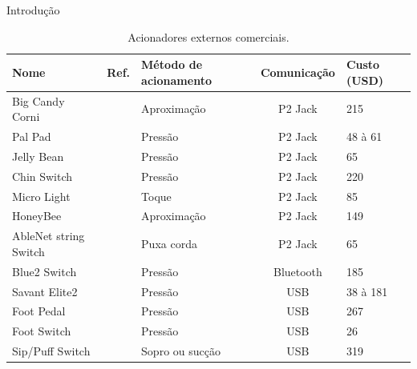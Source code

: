 \begin{chapter}{Introdução}
\begin{table}[!h]
\centering
\caption{Acionadores externos comerciais.}
\label{tab:acionadores}
\def\arraystretch{1.25}
\begin{tabular}{lcp{3cm}cp{3cm}}
	\hline
	\hline
	\textbf{Nome} & \textbf{Ref.} & \textbf{Método de acionamento} & \textbf{Comunicação} & \textbf{Custo (USD)} \\
	\hline
	Big Candy Corni        &~\cite{CandyCorn}        & Aproximação     & P2 Jack      & 215              \\
	Pal Pad                &~\cite{PalPad}           & Pressão         & P2 Jack      &  48 à 61         \\
	Jelly Bean             &~\cite{JellyBean}        & Pressão         & P2 Jack      &   65             \\
	Chin Switch            &~\cite{Chin}             & Pressão         & P2 Jack      & 220              \\
	Micro Light            &~\cite{MicroLight}       & Toque           & P2 Jack      & 85               \\ 
	HoneyBee               &~\cite{HoneyBee}         & Aproximação     & P2 Jack      & 149              \\
	AbleNet string Switch  &~\cite{StringSwitch}     & Puxa corda      & P2 Jack      & 65               \\
	Blue2 Switch           &~\cite{Blue2}            & Pressão         & Bluetooth    & 185              \\
	Savant Elite2          &~\cite{SavantElite2}     & Pressão         & USB          & 38 à 181         \\
	Foot Pedal             &~\cite{FootPedal}        & Pressão         & USB          & 267              \\
	Foot Switch            &~\cite{FootSwitch}       & Pressão         & USB          & 26               \\
	Sip/Puff Switch        &~\cite{SipPuff}          & Sopro ou sucção & USB          & 319              \\  
	
	\hline
	\hline
\end{tabular}
\end{table}


\end{chapter}
